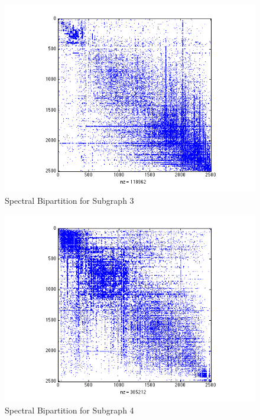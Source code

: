 \documentclass[11pt]{article}
\begin{document}
		 \begin{figure}[t]
		 		\begin{center}
		  		\includegraphics[width=1\linewidth]{spectral_partition_a3.png}
		  	\end{center}
		  	\vspace{-20pt}
		  	\caption{Spectral Bipartition for Subgraph 3}
		  	\label{fig:sb3}
		 \end{figure}
		 
		 \begin{figure}[t]
		 		\begin{center}
		  		\includegraphics[width=1\linewidth]{spectral_partition_a4.png}
		  	\end{center}
		  	\vspace{-20pt}
		  	\caption{Spectral Bipartition for Subgraph 4}
		  	\label{fig:sb4}
		 \end{figure}
		 
\end{document}
